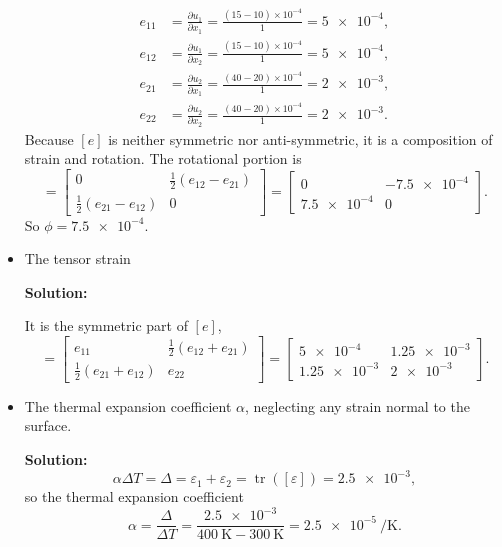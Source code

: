\documentclass[12pt]{article}
\DeclareMathOperator{\tr}{tr}
\begin{document}
\begin{itemize}
	      \begin{align}
		      e_{11} & = \frac{ \partial u_1 }{ \partial x_1 } = \frac{(15 - 10) \times 10^{-4}}{1} = \num{5e-4}, \\
		      e_{12} & = \frac{ \partial u_1 }{ \partial x_2 } = \frac{(15 - 10) \times 10^{-4}}{1} = \num{5e-4}, \\
		      e_{21} & = \frac{ \partial u_2 }{ \partial x_1 } = \frac{(40 - 20) \times 10^{-4}}{1} = \num{2e-3}, \\
		      e_{22} & = \frac{ \partial u_2 }{ \partial x_2 } = \frac{(40 - 20) \times 10^{-4}}{1} = \num{2e-3}.
	      \end{align}
	      Because $[e]$ is neither symmetric nor anti-symmetric, it is a composition of strain and rotation.
	      The rotational portion is
	      \begin{equation}
		      [w] = \begin{bmatrix}
			      0                             & \frac{1}{2} (e_{12} - e_{21}) \\
			      \frac{1}{2} (e_{21} - e_{12}) & 0
		      \end{bmatrix}
		      = \begin{bmatrix}
			      0            & \num{-7.5e-4} \\
			      \num{7.5e-4} & 0
		      \end{bmatrix}.
	      \end{equation}
	      So $\phi = \num{7.5e-4}$.

	\item The tensor strain

	      \textbf{Solution:}

	      It is the symmetric part of $[e]$,
	      \begin{equation}
		      [\varepsilon] = \begin{bmatrix}
			      e_{11}                        & \frac{1}{2} (e_{12} + e_{21}) \\
			      \frac{1}{2} (e_{21} + e_{12}) & e_{22}
		      \end{bmatrix}
		      = \begin{bmatrix}
			      \num{5e-4}    & \num{1.25e-3} \\
			      \num{1.25e-3} & \num{2e-3}
		      \end{bmatrix}.
	      \end{equation}
	\item The thermal expansion coefficient $\alpha$, neglecting any strain normal to the surface.

	      \textbf{Solution:}
	      \begin{equation}
		      \alpha \Delta T = \Delta = \varepsilon_1 + \varepsilon_2 = \tr([\varepsilon]) = \num{2.5e-3},
	      \end{equation}
	      so the thermal expansion coefficient
	      \begin{equation}
		      \alpha = \frac{ \Delta }{ \Delta T } = \frac{ \num{2.5e-3} }{ \SI{400}{\kelvin} - \SI{300}{\kelvin} } = \SI{2.5e-5}{\per\kelvin}.
	      \end{equation}
\end{itemize}
\end{document}
